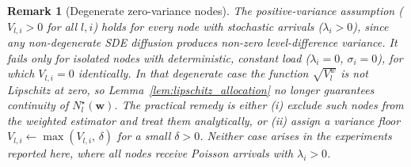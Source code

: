 \documentclass{ieeeaccess}
\newtheorem{remark}{Remark}
\begin{document}
\begin{remark}[Degenerate zero-variance nodes]
\label{rem:zero_variance}
The positive-variance assumption ($V_{l,i}>0$ for all $l,i$) holds for every node with
stochastic arrivals ($\lambda_i>0$), since any non-degenerate SDE diffusion produces
non-zero level-difference variance. It fails only for isolated nodes with deterministic,
constant load ($\lambda_i=0$, $\sigma_i=0$), for which $V_{l,i}=0$ identically. In that
degenerate case the function $\sqrt{V_l^w}$ is not Lipschitz at zero, so
Lemma~\ref{lem:lipschitz_allocation} no longer guarantees continuity of $N_l^\star(\mathbf{w})$.
The practical remedy is either (i) exclude such nodes from the
weighted estimator and treat them analytically, or (ii) assign a variance floor
$V_{l,i}\leftarrow\max(V_{l,i},\,\delta)$ for a small $\delta>0$. Neither case arises in
the experiments reported here, where all nodes receive Poisson arrivals with $\lambda_i>0$.
\end{remark}
\end{document}
